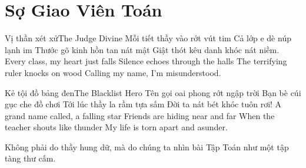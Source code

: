 \chapter{Sợ Giao Viên Toán}

\begin{tutuyetbox}{Vị thần xét xử}{The Judge Divine}
Mỗi tiết thầy vào rớt vút tim
Cả lớp e dè núp lạnh im
Thước gõ kinh hồn tan nát mật
Giật thót kêu danh khóc nát niềm.
\tcblower
Every class, my heart just falls 
Silence echoes through the halls 
The terrifying ruler knocks on wood 
Calling my name, I'm misunderstood.
\end{tutuyetbox}

\begin{tutuyetbox}{Kẻ tội đồ bảng đen}{The Blacklist Hero}
Tên gọi oai phong rớt ngập trời
Bạn bè cúi gục che đồ chơi
Tới lúc thầy la rầm tựa sấm
Đời ta nát bét khóc tuôn rơi!
\tcblower
A grand name called, a falling star 
Friends are hiding near and far 
When the teacher shouts like thunder 
My life is torn apart and asunder.
\end{tutuyetbox}

\begin{ghichu}
Không phải do thầy hung dữ, mà do chúng ta nhìn bài Tập Toán như một tập tàng thư cấm.
\end{ghichu}